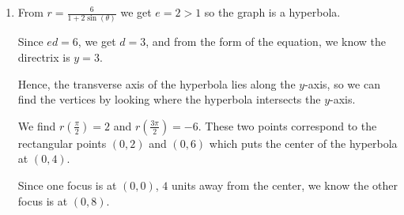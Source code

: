 \documentclass{ximera}
\begin{document}
\begin{example}
\begin{explanation}
\begin{enumerate}
 

We now have everything we need to graph $r = \frac{12}{3 - \cos(\theta)}$ below.\footnote{The directrix, $x = -12$ is too distant to represent on the graph below.}



\begin{image}
\end{image}

 
\item From $r = \frac{6}{1 + 2\sin(\theta)}$ we get $e = 2 > 1$ so the graph is a hyperbola.  


Since $ed = 6$, we get $d=3$, and from the form of the equation, we know the directrix is $y = 3$.  


Hence,  the transverse axis of the hyperbola lies along the $y$-axis, so we can find the vertices by looking where the hyperbola intersects the $y$-axis.  


We find $r\left( \frac{\pi}{2} \right) = 2$ and $r\left(\frac{3\pi}{2}\right) = -6$.  These two points correspond to the rectangular points $(0,2)$ and $(0,6)$ which puts the center of the hyperbola at $(0,4)$.  


Since one focus is at $(0,0)$,  $4$ units away from the center, we know the other focus is at $(0,8)$.  


\end{enumerate}
\end{explanation}
\end{example}
\end{document}
